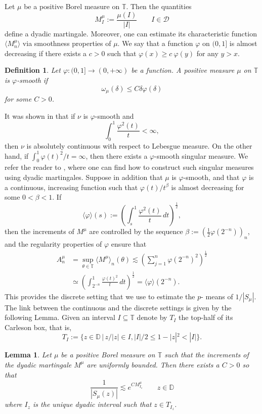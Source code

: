 \documentclass{birkjour}
\numberwithin{equation}{section}
\theoremstyle{plain}
\newtheorem{lemma}[theo]{Lemma}
\newtheorem{defi}{Definition}
\theoremstyle{definition}
\newcommand{\T}{\mathbb{T}}
\newcommand{\D}{\mathbb{D}}
\newcommand{\1}{\mathds{1}}
\newcommand{\charphi}{\langle \varphi\rangle}
\newcommand{\dyad}{\mathcal{D}}
\begin{document}
Let $\mu$ be a positive Borel measure on $\T$. Then the quantities
\[
M^\mu_I:=\frac{\mu(I)}{|I|}\qquad I\in \dyad
\]
define a dyadic martingale. Moreover, one can estimate its characteristic function $\langle M^\mu_n\rangle$ via smoothness properties of $\mu$.
We say that a function $\varphi$ on $(0,1]$ is almost decreasing if there exists a $c>0$ such that $\varphi(x)\ge c~\varphi(y)$ for  any $y >x$. 

\begin{defi}
\label{defi:smooth}
Let $\varphi:(0,1] \rightarrow (0, +\infty)$ be a function. A positive measure $\mu$ on $\T$ is $\varphi$-smooth if $$\omega_{\mu}(\delta)\leq C\delta\varphi(\delta)$$
for some $C>0$.
\end{defi} 
It was shown in \cite{Stein64} that if $\nu$ is $\varphi$-smooth and 
 \[
 \int_0^1\frac{\varphi^2(t)}{t}<\infty,
 \]
 then $\nu$ is absolutely continuous with respect to Lebesgue measure. On the other hand, if $\int_0^1\varphi(t)^2/t=\infty$, then there exists a $\varphi$-smooth singular measure. We refer the reader to \cite{Kahane69}, where one can find how to construct such singular measures using dyadic martingales. Suppose in addition that $\mu$ is $\varphi$-smooth, and that $\varphi$ is a continuous, increasing function such that $\varphi(t)/t^\beta$ is almost decreasing for some $0<\beta<1$. If 
\[
\charphi(s):=\left(\int_s^1\frac{\varphi^2(t)}{t}\,dt\right)^\frac{1}{2},
\]
then the increments of $M^\mu$ are controlled by the sequence $\beta:=\left(\frac{1}{2}\varphi(2^{-n})\right)_n$, and the regularity properties of $\varphi$ ensure that 
\begin{equation}
\label{eqn:B_n}
\begin{split}
A_n^\mu&=\sup_{\theta\in\T}\langle M^\mu\rangle_n(\theta)\lesssim\left(\sum_{j=1}^n \varphi(2^{-n})^2\right)^\frac{1}{2}\\
&\simeq \left(\int_{2^{-n}}^1\frac{\varphi(t)^2}{t}\,dt\right)^\frac{1}{2}=\charphi(2^{-n}).
\end{split}
\end{equation}
This provides the discrete setting that we use to estimate the $p$- means of $1/|S_\mu|$. The link between the continuous and the discrete settings is given by the following Lemma. Given an interval $I\subseteq\T$ denote by $T_I$ the top-half of its Carleson box, that is, 
\[
T_I:=\{z\in\D\,|\, z/|z|\in I, |I|/2\le1-|z|^2<|I|\}.
\]
\begin{lemma}
\label{lemma:Poisson}
Let $\mu$ be a positive Borel measure on $\T$ such that the increments of the dyadic martingale $M^\mu$ are uniformly bounded. Then there exists a $C>0$ so that
\[
\frac{1}{|S_\mu(z)|}\lesssim e^{CM^\mu_{I_z}}\qquad z\in\D
\]
where $I_z$ is the unique dyadic interval such that $z\in T_{I_z}$.
\end{lemma}
\end{document}
